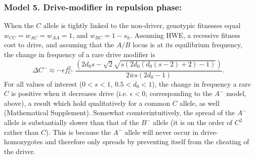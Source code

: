 \documentclass[12pt,letterpaper]{article}
\newcommand{\yb}[1]{{ \color{blue} #1}}
\begin{document}
\subsubsection*{Model 5. Drive-modifier in repulsion phase:}
When the $C$ allele is tightly linked to the non-driver, 
	genotypic fitnesses equal $w_{CC}=w_{AC}=w_{AA}=1$, and $w_{BC}=1-s_h$. 
Assuming HWE, a recessive fitness cost to drive, and assuming that the $A/B$ locus is at its equilibrium frequency, the change in frequency of a rare drive modifier is
\begin{equation}
	\Delta C^- \approx -\epsilon f_{C^-}^2 \frac{ \left(2 d_0 s-\sqrt{2} \sqrt{s (2 d_0 (d_0 (s-2)+2)-1)}\right)}{2\bar{w}s (2 d_0 -1) }. \label{A-}
\end{equation}
For all values of interest ($0<s<1$, $0.5<d_0<1$), the change in frequency a rare $C$ is positive when it decreases drive (i.e. $\epsilon <0$, corresponding to the $A^-$ model, above), a result which hold qualitatively for a common $C$ allele, as well (Mathematical Supplement). 
Somewhat counterintuitively, the spread of the $A^-$ allele is substantially slower than that of the $B^-$ allele (it is on the order of $C^{2}$ rather than $C$). 
This is because the $A^-$ allele will never occur in drive-homozygotes and therefore only spreads by preventing itself from the cheating of the driver.
\end{document}
